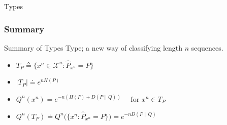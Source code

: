 \documentclass[9pt]{beamer}
\begin{document}
\begin{section}{Types}
        \begin{frame}
            \frametitle{Summary}
            \begin{block}{Summary of Types}
                Type; a new way of classifying length $n$ sequences.
                \begin{itemize}
                    \item $T_P \triangleq\big\{x^n \in \mathcal{X}^n: \hat{P}_{x^n}=P\big\}$
                    \item $\left|T_P\right| \doteq e^{n H(P)}$
                    \item $Q^n\left(x^n\right)=e^{-n(H(P)+D(P \| Q))} \quad \text { for } x^n \in T_P $
                    \item $Q^n\left(T_P\right) \doteq Q^n\big(\big\{x^n: \hat{P}_{x^n}=P\big\}\big)=e^{-n D(P \| Q)}$
                \end{itemize}
                
            \end{block}
        \end{frame}
    \end{section}
\end{document}
